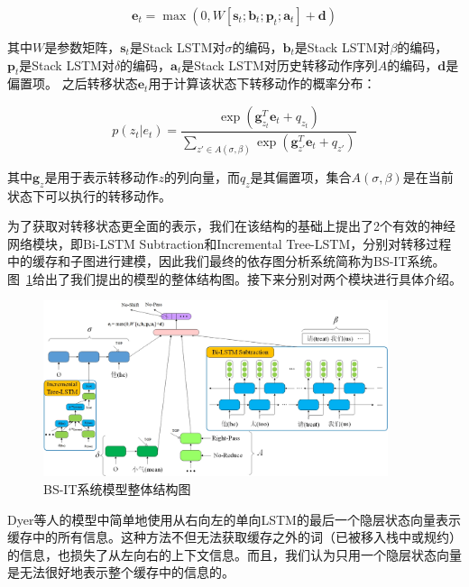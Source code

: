 \vspace{-0.6em}
\begin{equation}
	\label{eq:trans}
	\mathbf{e}_t=\max(0,W[\mathbf{s}_t;\mathbf{b}_t; \mathbf{p}_t; \mathbf{a}_t ]+\mathbf{d})
\end{equation}

其中$W$是参数矩阵，$\mathbf{s}_t$是Stack LSTM对$\sigma$的编码，$\mathbf{b}_t$是Stack LSTM对$\beta$的编码， $\mathbf{p}_t$是Stack LSTM对$\delta$的编码，$\mathbf{a}_t$是Stack LSTM对历史转移动作序列$A$的编码，$\mathbf{d}$是偏置项。
之后转移状态$\mathbf{e}_t$用于计算该状态下转移动作的概率分布：

\vspace{-0.6em}
\begin{equation}
	\label{eq:trans-softmax}
	p(z_t|e_t)=\frac{\exp(\mathbf{g}^T_{z_t}\mathbf{e}_t + q_{z_t})}{\sum_{z'\in A(\sigma, \beta)}\exp (\mathbf{g}^T_{z'}\mathbf{e}_t+q_{z'})}
\end{equation}

其中$\mathbf{g}_z$是用于表示转移动作$z$的列向量，而$q_z$是其偏置项，集合$A(\sigma,\beta)$是在当前状态下可以执行的转移动作。

为了获取对转移状态更全面的表示，我们在该结构的基础上提出了2个有效的神经网络模块，即Bi-LSTM Subtraction和Incremental Tree-LSTM，分别对转移过程中的缓存和子图进行建模，因此我们最终的依存图分析系统简称为BS-IT系统。图~\ref{fig:bsit}给出了我们提出的模型的整体结构图。接下来分别对两个模块进行具体介绍。

\begin{figure}[hbtp]
	\centering
	\includegraphics[width=0.9\textwidth]{figures/bs-it.jpg}
	\caption{BS-IT系统模型整体结构图}
	\label{fig:bsit}
\end{figure}

Dyer等人的模型中简单地使用从右向左的单向LSTM的最后一个隐层状态向量表示缓存中的所有信息。这种方法不但无法获取缓存之外的词（已被移入栈中或规约）的信息，也损失了从左向右的上下文信息。而且，我们认为只用一个隐层状态向量是无法很好地表示整个缓存中的信息的。


